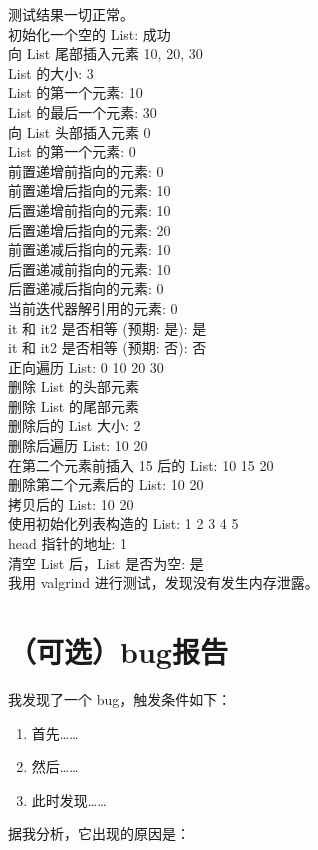 \documentclass[UTF8]{ctexart}
\begin{document}
测试结果一切正常。\\ 
\small{}初始化一个空的 List: 成功\\
向 List 尾部插入元素 10, 20, 30\\
List 的大小: 3\\
List 的第一个元素: 10\\
List 的最后一个元素: 30\\
向 List 头部插入元素 0\\
List 的第一个元素: 0\\
前置递增前指向的元素: 0\\
前置递增后指向的元素: 10\\
后置递增前指向的元素: 10\\
后置递增后指向的元素: 20\\
前置递减后指向的元素: 10\\
后置递减前指向的元素: 10\\
后置递减后指向的元素: 0\\
当前迭代器解引用的元素: 0\\
it 和 it2 是否相等 (预期: 是): 是\\
it 和 it2 是否相等 (预期: 否): 否\\
正向遍历 List: 0 10 20 30 \\
删除 List 的头部元素\\
删除 List 的尾部元素\\
删除后的 List 大小: 2\\
删除后遍历 List: 10 20 \\
在第二个元素前插入 15 后的 List: 10 15 20 \\
删除第二个元素后的 List: 10 20 \\
拷贝后的 List: 10 20 \\
使用初始化列表构造的 List: 1 2 3 4 5 \\
head 指针的地址: 1\\
清空 List 后，List 是否为空: 是\\

\Large{我用 valgrind 进行测试，发现没有发生内存泄露。}
\large{}
\section{（可选）bug报告}

我发现了一个 bug，触发条件如下：

\begin{enumerate}
    \item 首先……
    \item 然后……
    \item 此时发现……
\end{enumerate}

据我分析，它出现的原因是：
\end{document}
